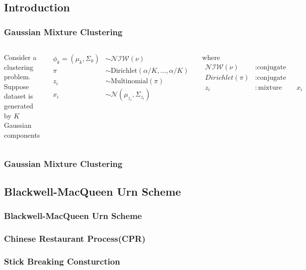 \documentclass{beamer}
\begin{document}
\subsection{Introduction}
\begin{frame}
\frametitle{Gaussian Mixture Clustering}

\begin{columns}
Consider a clustering problem. Suppose dataset is generated by $K$ Gaussian components

\begin{align*}
\phi_k = (\mu_k, \Sigma_k) & \sim \mathcal{NIW}(\nu) \\
\pi & \sim \text{Dirichlet}(\alpha/K, \ldots, \alpha/K) \\
z_i & \sim \text{Multinomial}(\pi) \\
x_i & \sim \mathcal{N}(\mu_{z_i}, \Sigma_{z_i})
\end{align*}

where 
\begin{align*}
\mathcal{NIW}(\nu) & : \text{conjugate prior of Gaussian} \\
Dirichlet(\pi) & : \text{conjugate prior of multinomial} \\
z_i & : \text{mixture indicator of} x_i
\end{align*}
\centering
\end{columns}
\end{frame}
\begin{frame}

\begin{frame}
\frametitle{Gaussian Mixture Clustering}
\begin{itemize}
\end{itemize}
\end{frame}

\end{frame}

\subsection{Blackwell-MacQueen Urn Scheme}
\begin{frame}
\frametitle{Blackwell-MacQueen Urn Scheme}
\end{frame}


\begin{frame}
\frametitle{Chinese Restaurant Process(CPR)}
\end{frame}


\begin{frame}
\frametitle{Stick Breaking Consturction}
\end{frame}
\end{document}
